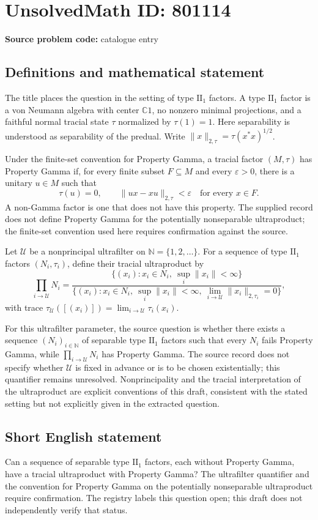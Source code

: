 \documentclass[11pt]{article}
\newcommand{\N}{\mathbb{N}}
\newcommand{\C}{\mathbb{C}}
\begin{document}
\section*{UnsolvedMath ID: 801114}
\textbf{Source problem code:} catalogue entry
\subsection{Definitions and mathematical statement}
The title places the question in the setting of type \(\mathrm{II}_1\) factors. A type \(\mathrm{II}_1\) factor is a von Neumann algebra with center \(\C 1\), no nonzero minimal projections, and a faithful normal tracial state \(\tau\) normalized by \(\tau(1)=1\). Here separability is understood as separability of the predual. Write \(\|x\|_{2,\tau}=\tau(x^*x)^{1/2}\).

Under the finite-set convention for Property Gamma, a tracial factor \((M,\tau)\) has Property Gamma if, for every finite subset \(F\subseteq M\) and every \(\varepsilon>0\), there is a unitary \(u\in M\) such that
\[
\tau(u)=0,\qquad \|ux-xu\|_{2,\tau}<\varepsilon\quad\text{for every }x\in F.
\]
A non-Gamma factor is one that does not have this property. The supplied record does not define Property Gamma for the potentially nonseparable ultraproduct; the finite-set convention used here requires confirmation against the source.

Let \(\mathcal U\) be a nonprincipal ultrafilter on \(\N=\{1,2,\ldots\}\). For a sequence of type \(\mathrm{II}_1\) factors \((N_i,\tau_i)\), define their tracial ultraproduct by
\[
\prod_{i\to\mathcal U}N_i
=
\frac{\{(x_i):x_i\in N_i,\ \sup_i\|x_i\|<\infty\}}
{\{(x_i):x_i\in N_i,\ \sup_i\|x_i\|<\infty,\ \lim_{i\to\mathcal U}\|x_i\|_{2,\tau_i}=0\}},
\]
with trace \(\tau_{\mathcal U}([(x_i)])=\lim_{i\to\mathcal U}\tau_i(x_i)\).

For this ultrafilter parameter, the source question is whether there exists a sequence \((N_i)_{i\in\N}\) of separable type \(\mathrm{II}_1\) factors such that every \(N_i\) fails Property Gamma, while \(\prod_{i\to\mathcal U}N_i\) has Property Gamma. The source record does not specify whether \(\mathcal U\) is fixed in advance or is to be chosen existentially; this quantifier remains unresolved. Nonprincipality and the tracial interpretation of the ultraproduct are explicit conventions of this draft, consistent with the stated setting but not explicitly given in the extracted question.
\subsection{Short English statement}
Can a sequence of separable type \(\mathrm{II}_1\) factors, each without Property Gamma, have a tracial ultraproduct with Property Gamma? The ultrafilter quantifier and the convention for Property Gamma on the potentially nonseparable ultraproduct require confirmation. The registry labels this question open; this draft does not independently verify that status.
\end{document}
